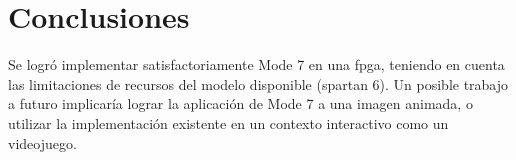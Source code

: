 \section{Conclusiones}
Se logró implementar satisfactoriamente Mode 7 en una fpga, teniendo en cuenta las limitaciones de recursos del modelo disponible (spartan 6). Un posible trabajo a futuro implicaría lograr la aplicación de Mode 7 a una imagen animada, o utilizar la implementación existente en un contexto interactivo como un videojuego.
